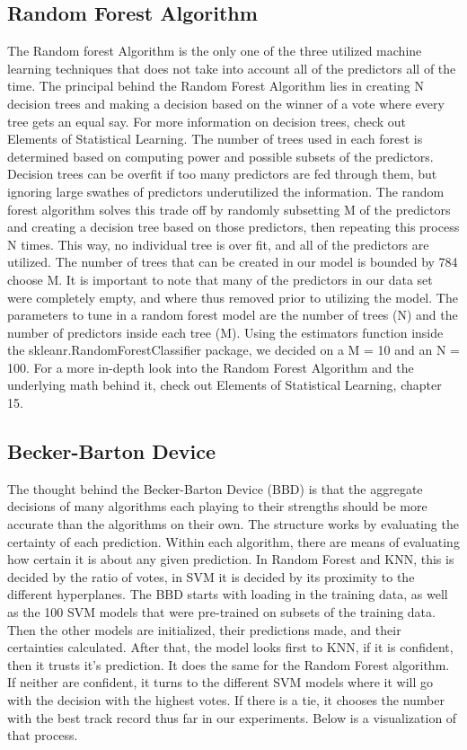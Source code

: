 \documentclass[11pt, oneside]{article}   	%
\begin{document}
\subsection{Random Forest Algorithm}
The Random forest Algorithm is the only one of the three utilized machine learning techniques that does not take into account all of the predictors all of the time. The principal behind the Random Forest Algorithm lies in creating N decision trees and making a decision based on the winner of a vote where every tree gets an equal say. For more information on decision trees, check out Elements of Statistical Learning. \cite{DecisionTree} The number of trees used in each forest is determined based on computing power and possible subsets of the predictors. Decision trees can be overfit if too many predictors are fed through them, but ignoring large swathes of predictors underutilized the information. The random forest algorithm solves this trade off by randomly subsetting M of the predictors and creating a decision tree based on those predictors, then repeating this process N times. This way, no individual tree is over fit, and all of the predictors are utilized. The number of trees that can be created in our model is bounded by 784 choose M.  It is important to note that many of the predictors in our data set were completely empty, and where thus removed prior to utilizing the model. The parameters to tune in a random forest model are the number of trees (N) and the number of predictors inside each tree (M). Using the estimators function inside the skleanr.RandomForestClassifier package, we decided on a M = 10 and an N = 100. For a more in-depth look into the Random Forest Algorithm and the underlying math behind it, check out Elements of Statistical Learning, chapter 15. \cite{RandomForestBook}
\subsection{Becker-Barton Device}
The thought behind the Becker-Barton Device (BBD) is that the aggregate decisions of many algorithms each playing to their strengths should be more accurate than the algorithms on their own. The structure works by evaluating the certainty of each prediction. Within each algorithm, there are means of evaluating how certain it is about any given prediction. In Random Forest and KNN, this is decided by the ratio of votes, in SVM it is decided by its proximity to the different hyperplanes. The BBD starts with loading in the training data, as well as the 100 SVM models that were pre-trained on subsets of the training data. Then the other models are initialized, their predictions made, and their certainties calculated. After that, the model looks first to KNN, if it is confident, then it trusts it's prediction. It does the same for the Random Forest algorithm. If neither are confident, it turns to the different SVM models where it will go with the decision with the highest votes. If there is a tie, it chooses the number with the best track record thus far in our experiments. Below is a visualization of that process. 
\end{document}
